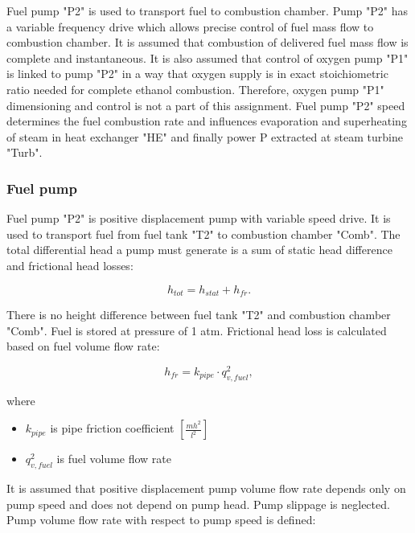 \documentclass{article}
\begin{document}
	Fuel pump "P2" is used to transport fuel to combustion chamber. Pump "P2" 
	has a variable frequency drive which allows precise control of fuel mass 
	flow to combustion chamber. It is assumed that combustion of delivered fuel 
	mass flow is complete and instantaneous. It is also assumed that control of 
	oxygen pump "P1" is linked to pump "P2" in a way that oxygen supply is in 
	exact stoichiometric ratio needed for complete ethanol combustion. 
	Therefore, oxygen pump "P1" dimensioning and control is not a part of this 
	assignment. 
	Fuel pump "P2" speed determines the fuel combustion rate and influences 
	evaporation and superheating of steam in heat exchanger "HE" and finally 
	power P extracted at steam turbine "Turb".
	
	\subsubsection*{Fuel pump}
	
	Fuel pump "P2" is positive displacement pump with variable speed drive. It 
	is used to transport fuel from fuel tank "T2" to combustion chamber "Comb". 
	The total differential head a pump must generate is a sum of static head 
	difference and frictional head losses: 
	
	\begin{equation}\label{eq:head_total}
		h_{tot} = h_{stat} + h_{fr}.
	\end{equation}
	
	There is no height difference between fuel tank "T2" and combustion chamber 
	"Comb". Fuel is stored at pressure of 1 atm.
	Frictional head loss is calculated based on fuel volume flow rate:
	
	\begin{equation}\label{eq:head_loss}
		h_{fr} = k_{pipe} \cdot q_{v,fuel}^2,
	\end{equation}
	
	\noindent
	where
	
	\begin{itemize}
		\item $k_{pipe}$ is pipe friction coefficient $\left[ \frac{mh^2}{l^2} \right]$
		\item $q_{v,fuel}^2$ is fuel volume flow rate
	\end{itemize}

	\noindent
	It is assumed that positive displacement pump volume flow rate depends only on pump speed and does not depend on pump head. Pump slippage is neglected. Pump volume flow rate with respect to pump speed is defined:
	
\end{document}

